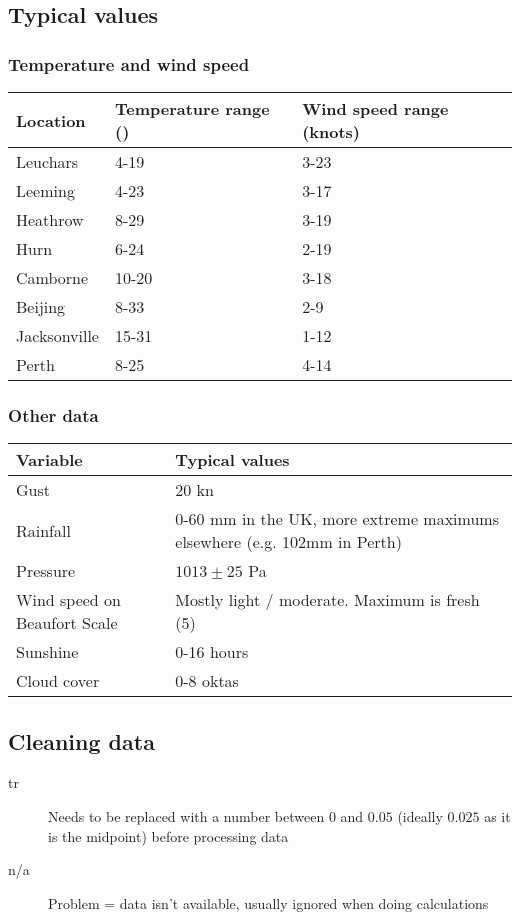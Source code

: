 \subsection{Typical values}
\subsubsection{Temperature and wind speed}
\begin{tabular}{|l|l|l|}
	\hline
	\textbf{Location} & \textbf{Temperature range (\textcelsius)}& \textbf{Wind speed range (knots)} \\
	\hline
	Leuchars & 4-19 & 3-23 \\
	\hline
	Leeming & 4-23 & 3-17 \\
	\hline
	Heathrow & 8-29 & 3-19 \\
	\hline
	Hurn & 6-24 & 2-19 \\
	\hline
	Camborne & 10-20 & 3-18 \\
	\hline
	Beijing & 8-33 & 2-9 \\
	\hline
	Jacksonville & 15-31 & 1-12 \\
	\hline
	Perth & 8-25 & 4-14 \\
	\hline
\end{tabular}

\subsubsection{Other data}
\begin{tabular}{|p{4.8cm} | p{12.2cm}|}
	\hline
	\textbf{Variable} & \textbf{Typical values} \\
	\hline
	Gust & 20 kn \\
	\hline
	Rainfall & 0-60 mm in the UK, more extreme maximums elsewhere (e.g. 102mm in Perth) \\
	\hline
	Pressure & $1013 \pm 25$ Pa \\
	\hline
	Wind speed on Beaufort Scale & Mostly light / moderate. Maximum is fresh (5) \\
	\hline
	Sunshine & 0-16 hours \\
	\hline
	Cloud cover & 0-8 oktas \\
	\hline
\end{tabular}

\subsection{Cleaning data}
\begin{description}
	\item[tr] Needs to be replaced with a number between $0$ and $0.05$ (ideally $0.025$ as it is the midpoint) before processing data
	\item[n/a] Problem = data isn't available, usually ignored when doing calculations
\end{description}